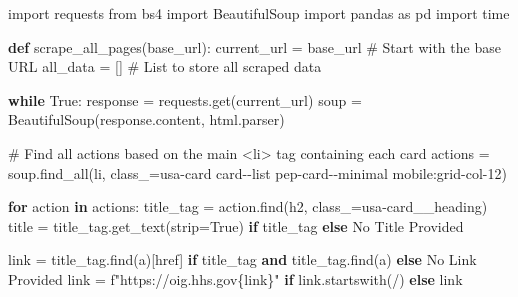 \documentclass[
  letterpaper,
  DIV=11,
  numbers=noendperiod]{scrartcl}
\newenvironment{Shaded}{\begin{snugshade}}{\end{snugshade}}
\newcommand{\CommentTok}[1]{\textcolor[rgb]{0.37,0.37,0.37}{#1}}
\newcommand{\ControlFlowTok}[1]{\textcolor[rgb]{0.00,0.23,0.31}{\textbf{#1}}}
\newcommand{\ImportTok}[1]{\textcolor[rgb]{0.00,0.46,0.62}{#1}}
\newcommand{\KeywordTok}[1]{\textcolor[rgb]{0.00,0.23,0.31}{\textbf{#1}}}
\newcommand{\NormalTok}[1]{\textcolor[rgb]{0.00,0.23,0.31}{#1}}
\newcommand{\OperatorTok}[1]{\textcolor[rgb]{0.37,0.37,0.37}{#1}}
\newcommand{\SpecialCharTok}[1]{\textcolor[rgb]{0.37,0.37,0.37}{#1}}
\newcommand{\SpecialStringTok}[1]{\textcolor[rgb]{0.13,0.47,0.30}{#1}}
\newcommand{\StringTok}[1]{\textcolor[rgb]{0.13,0.47,0.30}{#1}}
\newcommand{\VariableTok}[1]{\textcolor[rgb]{0.07,0.07,0.07}{#1}}
\begin{document}
\begin{Shaded}
\begin{Highlighting}[]
\ImportTok{import}\NormalTok{ requests}
\ImportTok{from}\NormalTok{ bs4 }\ImportTok{import}\NormalTok{ BeautifulSoup}
\ImportTok{import}\NormalTok{ pandas }\ImportTok{as}\NormalTok{ pd}
\ImportTok{import}\NormalTok{ time}

\KeywordTok{def}\NormalTok{ scrape\_all\_pages(base\_url):}
\NormalTok{    current\_url }\OperatorTok{=}\NormalTok{ base\_url  }\CommentTok{\# Start with the base URL}
\NormalTok{    all\_data }\OperatorTok{=}\NormalTok{ []  }\CommentTok{\# List to store all scraped data}

    \ControlFlowTok{while} \VariableTok{True}\NormalTok{:}
\NormalTok{        response }\OperatorTok{=}\NormalTok{ requests.get(current\_url)}
\NormalTok{        soup }\OperatorTok{=}\NormalTok{ BeautifulSoup(response.content, }\StringTok{\textquotesingle{}html.parser\textquotesingle{}}\NormalTok{)}

        \CommentTok{\# Find all actions based on the main \textless{}li\textgreater{} tag containing each card}
\NormalTok{        actions }\OperatorTok{=}\NormalTok{ soup.find\_all(}\StringTok{\textquotesingle{}li\textquotesingle{}}\NormalTok{, class\_}\OperatorTok{=}\StringTok{\textquotesingle{}usa{-}card card{-}{-}list pep{-}card{-}{-}minimal mobile:grid{-}col{-}12\textquotesingle{}}\NormalTok{)}

        \ControlFlowTok{for}\NormalTok{ action }\KeywordTok{in}\NormalTok{ actions:}
\NormalTok{            title\_tag }\OperatorTok{=}\NormalTok{ action.find(}\StringTok{\textquotesingle{}h2\textquotesingle{}}\NormalTok{, class\_}\OperatorTok{=}\StringTok{\textquotesingle{}usa{-}card\_\_heading\textquotesingle{}}\NormalTok{)}
\NormalTok{            title }\OperatorTok{=}\NormalTok{ title\_tag.get\_text(strip}\OperatorTok{=}\VariableTok{True}\NormalTok{) }\ControlFlowTok{if}\NormalTok{ title\_tag }\ControlFlowTok{else} \StringTok{\textquotesingle{}No Title Provided\textquotesingle{}}
            
\NormalTok{            link }\OperatorTok{=}\NormalTok{ title\_tag.find(}\StringTok{\textquotesingle{}a\textquotesingle{}}\NormalTok{)[}\StringTok{\textquotesingle{}href\textquotesingle{}}\NormalTok{] }\ControlFlowTok{if}\NormalTok{ title\_tag }\KeywordTok{and}\NormalTok{ title\_tag.find(}\StringTok{\textquotesingle{}a\textquotesingle{}}\NormalTok{) }\ControlFlowTok{else} \StringTok{\textquotesingle{}No Link Provided\textquotesingle{}}
\NormalTok{            link }\OperatorTok{=} \SpecialStringTok{f"https://oig.hhs.gov}\SpecialCharTok{\{}\NormalTok{link}\SpecialCharTok{\}}\SpecialStringTok{"} \ControlFlowTok{if}\NormalTok{ link.startswith(}\StringTok{\textquotesingle{}/\textquotesingle{}}\NormalTok{) }\ControlFlowTok{else}\NormalTok{ link}


\end{Highlighting}
\end{Shaded}
\end{document}
